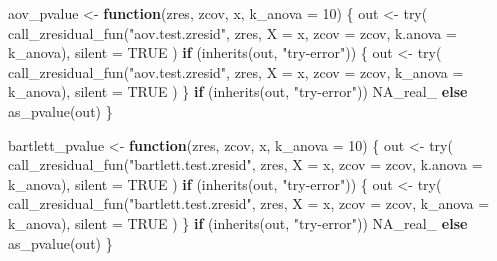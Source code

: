 \documentclass[
  english,
  letterpaper,
  DIV=11,
  numbers=noendperiod]{scrartcl}
\newenvironment{Shaded}{\begin{snugshade}}{\end{snugshade}}
\newcommand{\AttributeTok}[1]{\textcolor[rgb]{0.40,0.45,0.13}{#1}}
\newcommand{\ConstantTok}[1]{\textcolor[rgb]{0.56,0.35,0.01}{#1}}
\newcommand{\ControlFlowTok}[1]{\textcolor[rgb]{0.00,0.23,0.31}{\textbf{#1}}}
\newcommand{\DecValTok}[1]{\textcolor[rgb]{0.68,0.00,0.00}{#1}}
\newcommand{\FunctionTok}[1]{\textcolor[rgb]{0.28,0.35,0.67}{#1}}
\newcommand{\NormalTok}[1]{\textcolor[rgb]{0.00,0.23,0.31}{#1}}
\newcommand{\OtherTok}[1]{\textcolor[rgb]{0.00,0.23,0.31}{#1}}
\newcommand{\StringTok}[1]{\textcolor[rgb]{0.13,0.47,0.30}{#1}}
\begin{document}
\begin{Shaded}
\begin{Highlighting}[]
\NormalTok{aov\_pvalue }\OtherTok{\textless{}{-}} \ControlFlowTok{function}\NormalTok{(zres, zcov, x, }\AttributeTok{k\_anova =} \DecValTok{10}\NormalTok{) \{}
\NormalTok{  out }\OtherTok{\textless{}{-}} \FunctionTok{try}\NormalTok{(}
    \FunctionTok{call\_zresidual\_fun}\NormalTok{(}\StringTok{"aov.test.zresid"}\NormalTok{, zres, }\AttributeTok{X =}\NormalTok{ x, }\AttributeTok{zcov =}\NormalTok{ zcov, }\AttributeTok{k.anova =}\NormalTok{ k\_anova),}
    \AttributeTok{silent =} \ConstantTok{TRUE}
\NormalTok{  )}
  \ControlFlowTok{if}\NormalTok{ (}\FunctionTok{inherits}\NormalTok{(out, }\StringTok{"try{-}error"}\NormalTok{)) \{}
\NormalTok{    out }\OtherTok{\textless{}{-}} \FunctionTok{try}\NormalTok{(}
      \FunctionTok{call\_zresidual\_fun}\NormalTok{(}\StringTok{"aov.test.zresid"}\NormalTok{, zres, }\AttributeTok{X =}\NormalTok{ x, }\AttributeTok{zcov =}\NormalTok{ zcov, }\AttributeTok{k\_anova =}\NormalTok{ k\_anova),}
      \AttributeTok{silent =} \ConstantTok{TRUE}
\NormalTok{    )}
\NormalTok{  \}}
  \ControlFlowTok{if}\NormalTok{ (}\FunctionTok{inherits}\NormalTok{(out, }\StringTok{"try{-}error"}\NormalTok{)) }\ConstantTok{NA\_real\_} \ControlFlowTok{else} \FunctionTok{as\_pvalue}\NormalTok{(out)}
\NormalTok{\}}

\NormalTok{bartlett\_pvalue }\OtherTok{\textless{}{-}} \ControlFlowTok{function}\NormalTok{(zres, zcov, x, }\AttributeTok{k\_anova =} \DecValTok{10}\NormalTok{) \{}
\NormalTok{  out }\OtherTok{\textless{}{-}} \FunctionTok{try}\NormalTok{(}
    \FunctionTok{call\_zresidual\_fun}\NormalTok{(}\StringTok{"bartlett.test.zresid"}\NormalTok{, zres, }\AttributeTok{X =}\NormalTok{ x, }\AttributeTok{zcov =}\NormalTok{ zcov, }\AttributeTok{k.anova =}\NormalTok{ k\_anova),}
    \AttributeTok{silent =} \ConstantTok{TRUE}
\NormalTok{  )}
  \ControlFlowTok{if}\NormalTok{ (}\FunctionTok{inherits}\NormalTok{(out, }\StringTok{"try{-}error"}\NormalTok{)) \{}
\NormalTok{    out }\OtherTok{\textless{}{-}} \FunctionTok{try}\NormalTok{(}
      \FunctionTok{call\_zresidual\_fun}\NormalTok{(}\StringTok{"bartlett.test.zresid"}\NormalTok{, zres, }\AttributeTok{X =}\NormalTok{ x, }\AttributeTok{zcov =}\NormalTok{ zcov, }\AttributeTok{k\_anova =}\NormalTok{ k\_anova),}
      \AttributeTok{silent =} \ConstantTok{TRUE}
\NormalTok{    )}
\NormalTok{  \}}
  \ControlFlowTok{if}\NormalTok{ (}\FunctionTok{inherits}\NormalTok{(out, }\StringTok{"try{-}error"}\NormalTok{)) }\ConstantTok{NA\_real\_} \ControlFlowTok{else} \FunctionTok{as\_pvalue}\NormalTok{(out)}
\NormalTok{\}}


\end{Highlighting}
\end{Shaded}
\end{document}
